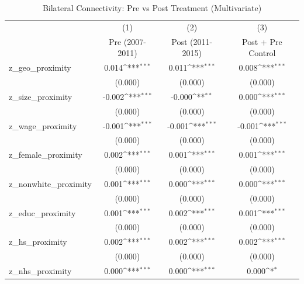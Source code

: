 \begin{table}[htbp]\centering
\def\sym#1{\ifmmode^{#1}\else\(^{#1}\)\fi}
\caption{Bilateral Connectivity: Pre vs Post Treatment (Multivariate)}
\begin{tabular}{l*{3}{c}}
\toprule
                    &\multicolumn{1}{c}{(1)}&\multicolumn{1}{c}{(2)}&\multicolumn{1}{c}{(3)}\\
                    &\multicolumn{1}{c}{Pre (2007-2011)}&\multicolumn{1}{c}{Post (2011-2015)}&\multicolumn{1}{c}{Post + Pre Control}\\
\midrule
z\_geo\_proximity     &       0.014\sym{***}&       0.011\sym{***}&       0.008\sym{***}\\
                    &     (0.000)         &     (0.000)         &     (0.000)         \\
\addlinespace
z\_size\_proximity    &      -0.002\sym{***}&      -0.000\sym{**} &       0.000\sym{***}\\
                    &     (0.000)         &     (0.000)         &     (0.000)         \\
\addlinespace
z\_wage\_proximity    &      -0.001\sym{***}&      -0.001\sym{***}&      -0.001\sym{***}\\
                    &     (0.000)         &     (0.000)         &     (0.000)         \\
\addlinespace
z\_female\_proximity  &       0.002\sym{***}&       0.001\sym{***}&       0.001\sym{***}\\
                    &     (0.000)         &     (0.000)         &     (0.000)         \\
\addlinespace
z\_nonwhite\_proximity&       0.001\sym{***}&       0.000\sym{***}&       0.000\sym{***}\\
                    &     (0.000)         &     (0.000)         &     (0.000)         \\
\addlinespace
z\_educ\_proximity    &       0.001\sym{***}&       0.002\sym{***}&       0.001\sym{***}\\
                    &     (0.000)         &     (0.000)         &     (0.000)         \\
\addlinespace
z\_hs\_proximity      &       0.002\sym{***}&       0.002\sym{***}&       0.002\sym{***}\\
                    &     (0.000)         &     (0.000)         &     (0.000)         \\
\addlinespace
z\_nhs\_proximity     &       0.000\sym{***}&       0.000\sym{***}&       0.000\sym{*}  \\

\end{tabular}
\end{table}
